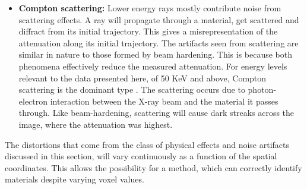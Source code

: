 \begin{itemize}
  \item \textbf{Compton scattering:} Lower energy rays mostly contribute noise
      from scattering effects. A ray will propagate through a material, get
      scattered and diffract from its initial trajectory. This gives a
      misrepresentation of the attenuation along its initial trajectory. The
      artifacts seen from scattering are similar in nature to those formed by
      beam hardening. This is because both phenomena effectively reduce the
      measured attenuation. For energy levels relevant to the data presented
      here, of 50 KeV and above, Compton scattering is the dominant type
      \citep{Compton}. The scattering occurs due to photon-electron interaction
      between the X-ray beam and the material it passes through. Like
      beam-hardening, scattering will cause dark streaks across the image,
      where the attenuation was highest.
\end{itemize}

The distortions that come from the class of physical effects and noise
artifacts discussed in this section, will vary continuously as a function of
the spatial coordinates. This allows the possibility for a method, which can
correctly identify materials despite varying voxel values.



